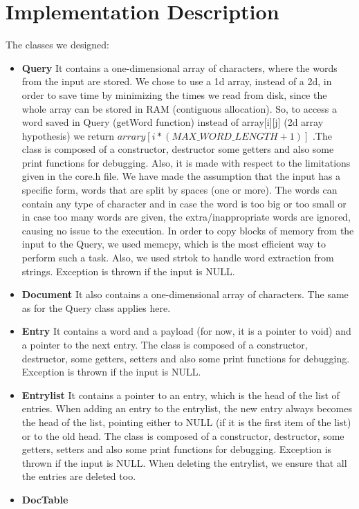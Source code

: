 \documentclass{article}
\begin{document}
\section{Implementation Description}
The classes we designed:
\begin{itemize}
  \item \textbf{Query}
  It contains a one-dimensional array of characters, where the words from the input are stored. We chose to use a 1d array, instead of a 2d, in order to save time by minimizing the times we read from disk, since the whole array can be stored in RAM (contiguous allocation). So, to access a word saved in Query (getWord function) instead of array[i][j] (2d array hypothesis) we return $arrary[i*(MAX\_WORD\_LENGTH + 1)]$ .The class is composed of a constructor, destructor some getters and also some print functions for debugging. Also, it is made with respect to the limitations given in the core.h file. We have made the assumption that the input has a specific form, words that are split by spaces (one or more). The words can contain any type of character and in case the word is too big or too small or in case too many words are given, the extra/inappropriate words are ignored, causing no issue to the execution. In order to copy blocks of memory from the input to the Query, we used memcpy, which is the most efficient way to perform such a task. Also, we used strtok to handle word extraction from strings. Exception is thrown if the input is NULL.
  \item \textbf{Document} 
  It also contains a one-dimensional array of characters. The same as for the Query class applies here.
  \item \textbf{Entry}
  It contains a word and a payload (for now, it is a pointer to void) and a pointer to the next entry. The class is composed of a constructor, destructor, some getters, setters and also some print functions for debugging. Exception is thrown if the input is NULL.
  \item \textbf{Entrylist} 
  It contains a pointer to an entry, which is the head of the list of entries. When adding an entry to the entrylist, the new entry always becomes the head of the list, pointing either to NULL (if it is the first item of the list) or to the old head. The class is composed of a constructor, destructor, some getters, setters and also some print functions for debugging. Exception is thrown if the input is NULL.
  When deleting the entrylist, we ensure that all the entries are deleted too.
  \item \textbf{DocTable}

\end{itemize}
\end{document}
